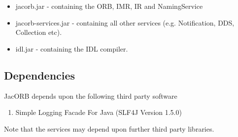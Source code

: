 \begin{itemize}
\item jacorb.jar          - containing the ORB, IMR, IR and NamingService
\item jacorb-services.jar - containing all other services (e.g. Notification, DDS, Collection etc).
\item idl.jar             - containing the IDL compiler.
\end{itemize}

\subsection{Dependencies}

JacORB depends upon the following third party software
\begin{enumerate}
\item Simple Logging Facade For Java (SLF4J Version 1.5.0)
\end{enumerate}

Note that the services may depend upon further third party libraries.


